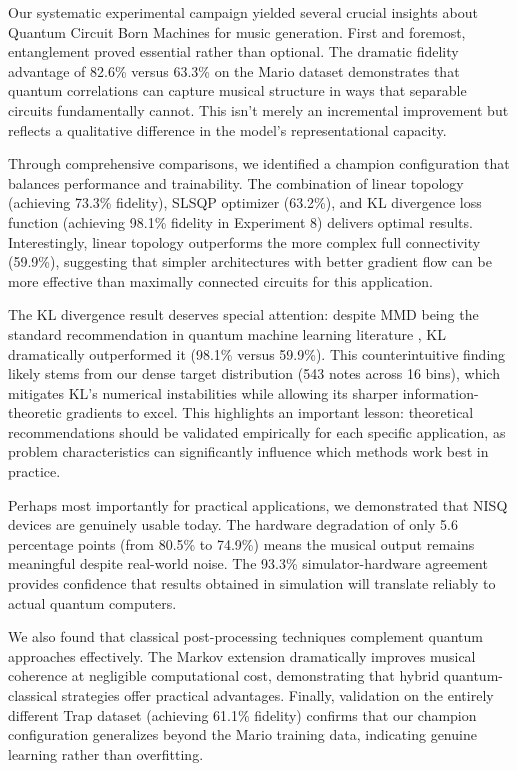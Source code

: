 \documentclass[11pt,a4paper]{article}
\begin{document}
Our systematic experimental campaign yielded several crucial insights about Quantum Circuit Born Machines for music generation. First and foremost, entanglement proved essential rather than optional. The dramatic fidelity advantage of 82.6\% versus 63.3\% on the Mario dataset demonstrates that quantum correlations can capture musical structure in ways that separable circuits fundamentally cannot. This isn't merely an incremental improvement but reflects a qualitative difference in the model's representational capacity.

Through comprehensive comparisons, we identified a champion configuration that balances performance and trainability. The combination of linear topology (achieving 73.3\% fidelity), SLSQP optimizer (63.2\%), and KL divergence loss function (achieving 98.1\% fidelity in Experiment 8) delivers optimal results. Interestingly, linear topology outperforms the more complex full connectivity (59.9\%), suggesting that simpler architectures with better gradient flow can be more effective than maximally connected circuits for this application. 

The KL divergence result deserves special attention: despite MMD being the standard recommendation in quantum machine learning literature \cite{Benedetti2019}, KL dramatically outperformed it (98.1\% versus 59.9\%). This counterintuitive finding likely stems from our dense target distribution (543 notes across 16 bins), which mitigates KL's numerical instabilities while allowing its sharper information-theoretic gradients to excel. This highlights an important lesson: theoretical recommendations should be validated empirically for each specific application, as problem characteristics can significantly influence which methods work best in practice.

Perhaps most importantly for practical applications, we demonstrated that NISQ devices are genuinely usable today. The hardware degradation of only 5.6 percentage points (from 80.5\% to 74.9\%) means the musical output remains meaningful despite real-world noise. The 93.3\% simulator-hardware agreement provides confidence that results obtained in simulation will translate reliably to actual quantum computers.

We also found that classical post-processing techniques complement quantum approaches effectively. The Markov extension dramatically improves musical coherence at negligible computational cost, demonstrating that hybrid quantum-classical strategies offer practical advantages. Finally, validation on the entirely different Trap dataset (achieving 61.1\% fidelity) confirms that our champion configuration generalizes beyond the Mario training data, indicating genuine learning rather than overfitting.
\end{document}
